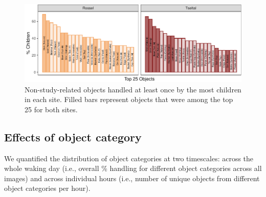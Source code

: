 \documentclass[10pt, letterpaper]{article}
\newenvironment{CodeChunk}{}{}
\begin{document}
\begin{CodeChunk}
\begin{figure}[!ht]

{\centering \includegraphics{figs/top-objects-fig-1} 

}

\caption[Non-study-related objects handled at least once by the most children in each site]{Non-study-related objects handled at least once by the most children in each site. Filled bars represent objects that were among the top 25 for both sites.}\label{fig:top-objects-fig}
\end{figure}
\end{CodeChunk}

\hypertarget{effects-of-object-category}{%
\subsection{Effects of object
category}\label{effects-of-object-category}}

We quantified the distribution of object categories at two timescales:
across the whole waking day (i.e., overall \% handling for different
object categories across all images) and across individual hours (i.e.,
number of unique objects from different object categories per hour).
\end{document}
